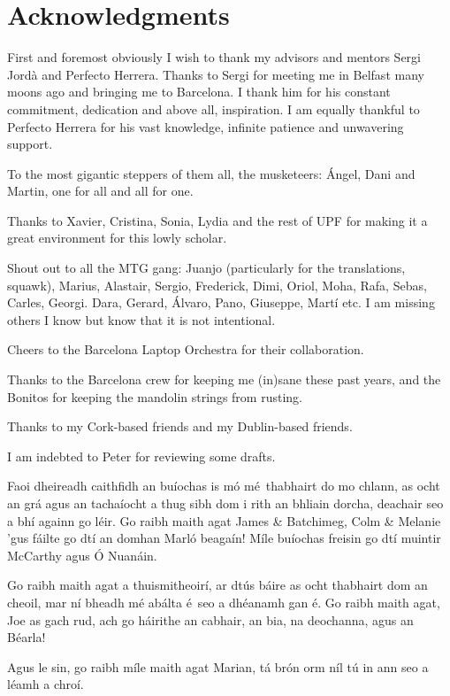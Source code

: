 \chapter*{Acknowledgments}

First and foremost obviously I wish to thank my advisors and mentors Sergi Jordà and Perfecto Herrera. Thanks to Sergi for meeting me in Belfast many moons ago and bringing me to Barcelona. I thank him for his constant commitment, dedication and above all, inspiration. I am equally thankful to Perfecto Herrera for his vast knowledge, infinite patience and unwavering support. 

To the most gigantic steppers of them all, the musketeers: Ángel, Dani and Martin, one for all and all for one.

Thanks to Xavier, Cristina, Sonia, Lydia and the rest of UPF for making it a great environment for this lowly scholar.

Shout out to all the MTG gang: Juanjo (particularly for the translations, squawk), Marius, Alastair, Sergio, Frederick, Dimi, Oriol, Moha, Rafa, Sebas, Carles, Georgi. Dara, Gerard, Álvaro, Pano, Giuseppe, Martí etc. I am missing others I know but know that it is not intentional. 

Cheers to the Barcelona Laptop Orchestra for their collaboration.

Thanks to the Barcelona crew for keeping me (in)sane these past years, and the Bonitos for keeping the mandolin strings from rusting.

Thanks to my Cork-based friends and my Dublin-based friends.

I am indebted to Peter for reviewing some drafts.

Faoi dheireadh caithfidh an buíochas is mó mé thabhairt  do mo chlann, as ocht an grá agus an  tachaíocht a thug sibh dom i rith an bhliain dorcha, deachair seo a bhí againn go léir. Go raibh maith agat James \& Batchimeg, Colm \& Melanie 'gus fáilte go dtí an domhan Marló beagaín! Míle buíochas freisin go dtí muintir McCarthy agus Ó Nuanáin.

Go raibh maith agat a thuismitheoirí, ar dtús báire as ocht thabhairt dom an cheoil, mar ní bheadh mé abálta é seo a dhéanamh gan é. Go raibh maith agat, Joe as gach rud, ach go háirithe an cabhair, an bia, na deochanna, agus an Béarla!

Agus le sin, go raibh míle maith agat Marian, tá brón orm níl tú in ann seo a léamh a chroí.
%
%
\normalsize